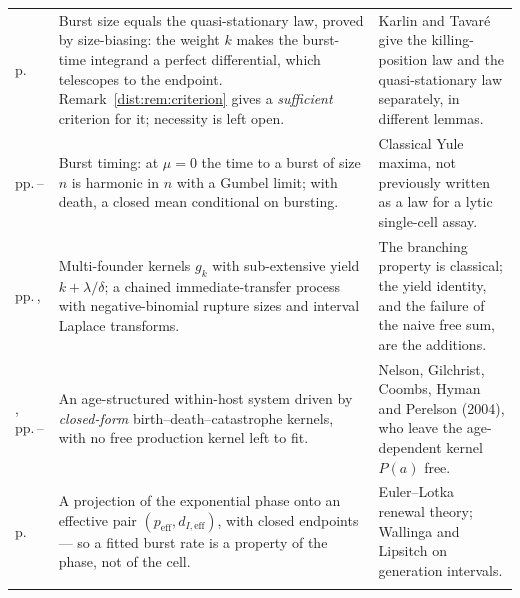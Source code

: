 {\begin{xltabular}{\linewidth}{@{}>{\raggedright\arraybackslash}p{20mm}O>{\raggedright\arraybackslash}p{40mm}@{}}
\newline p.\,\pageref{dist:thm:identity} &
Burst size equals the quasi-stationary law, proved by size-biasing: the weight $k$ makes
the burst-time integrand a perfect differential, which telescopes to the endpoint.
Remark~\ref{dist:rem:criterion} gives a \emph{sufficient} criterion for it; necessity is left open. &
Karlin and Tavar\'e give the killing-position law and the quasi-stationary law separately,
in different lemmas. \\
\addlinespace[3pt]

\newline pp.\,\pageref{dist:prop:taugivenk}--\pageref{dist:prop:tauburst} &
Burst timing: at $\mu=0$ the time to a burst of size $n$ is harmonic in $n$ with a Gumbel
limit; with death, a closed mean conditional on bursting. &
Classical Yule maxima, not previously written as a law for a lytic single-cell assay. \\
\addlinespace[3pt]

\newline pp.\,\pageref{dist:sec:moi}, \pageref{dist:sec:chained} &
Multi-founder kernels $g_k$ with sub-extensive yield $k+\lambda/\delta$; a chained
immediate-transfer process with negative-binomial rupture sizes and interval Laplace
transforms. &
The branching property is classical; the yield identity, and the failure of the naive free
sum, are the additions. \\
\addlinespace[3pt]

, \newline pp.\,\pageref{p:def:renewal-system}--\pageref{p:eq:skeleton} &
An age-structured within-host system driven by \emph{closed-form} birth--death--catastrophe
kernels, with no free production kernel left to fit. &
Nelson, Gilchrist, Coombs, Hyman and Perelson (2004), who leave the age-dependent kernel
$P(a)$ free. \\
\addlinespace[3pt]

\newline p.\,\pageref{p:thm:projection} &
A projection of the exponential phase onto an effective pair
$(p_{\mathrm{eff}},d_{I,\mathrm{eff}})$, with closed endpoints --- so a fitted burst rate
is a property of the phase, not of the cell. &
Euler--Lotka renewal theory; Wallinga and Lipsitch on generation intervals. \\
\addlinespace[3pt]


\end{xltabular}}
